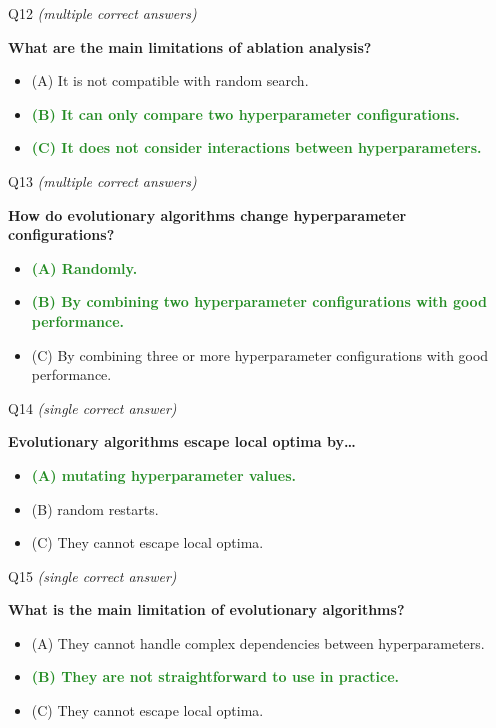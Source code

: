 \documentclass[main]{subfiles}
\newcommand{\correct}[1]{\textcolor{ForestGreen}{\textbf{#1} \checkmark}}
\newcommand{\wrong}[1]{#1}
\begin{document}
\begin{frame}{Q12 \hfill \small\normalfont\textit{(multiple correct answers)}}

\textbf{What are the main limitations of ablation analysis?}

\begin{itemize}
    \item \wrong{(A) \; It is not compatible with random search.}
    \item \correct{(B) \; It can only compare two hyperparameter configurations.}
    \item \correct{(C) \; It does not consider interactions between hyperparameters.}
\end{itemize}

\end{frame}

\begin{frame}{Q13 \hfill \small\normalfont\textit{(multiple correct answers)}}

\textbf{How do evolutionary algorithms change hyperparameter configurations?}

\begin{itemize}
    \item \correct{(A) \; Randomly.}
    \item \correct{(B) \; By combining two hyperparameter configurations with good performance.}
    \item \wrong{(C) \; By combining three or more hyperparameter configurations with good performance.}
\end{itemize}

\end{frame}

\begin{frame}{Q14 \hfill \small\normalfont\textit{(single correct answer)}}

\textbf{Evolutionary algorithms escape local optima by\ldots{}}

\begin{itemize}
    \item \correct{(A) \; mutating hyperparameter values.}
    \item \wrong{(B) \; random restarts.}
    \item \wrong{(C) \; They cannot escape local optima.}
\end{itemize}

\end{frame}

\begin{frame}{Q15 \hfill \small\normalfont\textit{(single correct answer)}}

\textbf{What is the main limitation of evolutionary algorithms?}

\begin{itemize}
    \item \wrong{(A) \; They cannot handle complex dependencies between hyperparameters.}
    \item \correct{(B) \; They are not straightforward to use in practice.}
    \item \wrong{(C) \; They cannot escape local optima.}
\end{itemize}

\end{frame}
\end{document}
